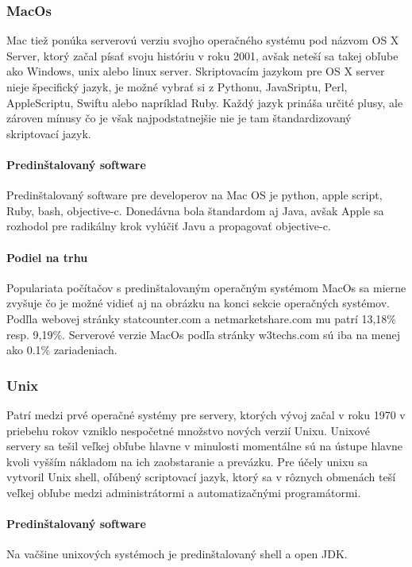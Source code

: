 \subsubsection{MacOs}
\indent  Mac tiež ponúka serverovú verziu svojho operačného systému pod názvom OS X Server, ktorý začal písať svoju históriu v roku 2001, avšak neteší sa takej obľube ako Windows, unix alebo linux server. Skriptovacím jazykom pre OS X server nieje špecifický jazyk, je možné vybrať si z Pythonu, JavaSriptu, Perl, AppleScriptu, Swiftu alebo napríklad Ruby. Každý jazyk prináša určité plusy, ale zároven mínusy čo je však najpodstatnejšie nie je tam štandardizovaný skriptovací jazyk.
\paragraph{Predinštalovaný software}
\indent Predinštalovaný software pre developerov na Mac OS je python, apple script, Ruby, bash, objective-c. Donedávna bola štandardom aj Java, avšak Apple sa rozhodol pre radikálny krok vylúčiť Javu a propagovať objective-c.
\paragraph{Podiel na trhu}
\indent Populariata počítačov s predinštalovaným operačným systémom MacOs sa mierne zvyšuje čo je možné vidieť aj na obrázku na konci sekcie operačných systémov. Podľla webovej stránky statcounter.com\cite{statcounter} a netmarketshare.com\cite{netmarketshare} mu patrí 13,18\% resp.  9,19\%.
\newline
\indent Serverové verzie MacOs podľa stránky w3techs.com\cite{pop} sú iba na menej ako 0.1\% zariadeniach.
\subsubsection{Unix}
\indent Patrí medzi prvé operačné systémy pre servery, ktorých vývoj začal v roku 1970 v priebehu rokov vzniklo nespočetné množstvo nových verzií Unixu. Unixové servery sa tešil veľkej obľube hlavne v minulosti momentálne sú na ústupe hlavne kvoli vyšším nákladom na ich zaobstaranie a prevázku. Pre účely unixu sa vytvoril Unix shell, oľúbený scriptovací jazyk, ktorý sa v rôznych obmenách teší veľkej obľube medzi administrátormi a automatizačnými programátormi.
\paragraph{Predinštalovaný software}
\indent Na vačšine unixových systémoch je predinštalovaný shell a open JDK.
\newline
